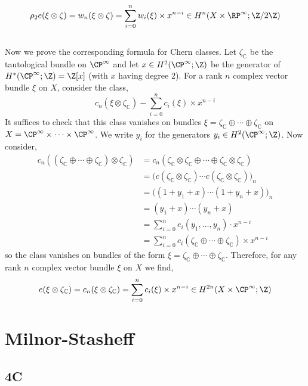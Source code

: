 \documentclass[12pt]{extarticle}
\newcommand{\C}{\mathbb{C}}
\begin{document}
\[ \rho_2 e(\xi \otimes \zeta) = w_n(\xi \otimes \zeta) = \sum_{i = 0}^n w_i(\xi) \times x^{n-i} \in H^n(X \times \RP^\infty; \Z / 2 \Z) \]
\bigskip\\
Now we prove the corresponding formula for Chern classes. Let $\zeta_\C$ be the tautological bundle on $\CP^\infty$ and let $x \in H^2(\CP^\infty;\Z)$ be the generator of $H^*(\CP^\infty ; \Z) = \Z[x]$ (with $x$ having degree $2$). For a rank $n$ complex vector bundle $\xi$ on $X$, consider the class,
\[ c_n(\xi \otimes \zeta_\C) - \sum_{i = 0}^n c_i(\xi) \times x^{n-i} \]
It suffices to check that this class vanishes on bundles $\xi = \zeta_\C \oplus \cdots \oplus \zeta_\C$ on $X = \CP^\infty \times \cdots \times \CP^\infty$. We write $y_i$ for the generators $y_i \in H^2(\CP^\infty; \Z)$. Now consider,
\begin{align*}
c_n((\zeta_\C \oplus \cdots \oplus \zeta_\C) \otimes \zeta_\C) & = c_n(\zeta_\C \otimes \zeta_\C \oplus \cdots \oplus \zeta_\C \otimes \zeta_\C) 
\\
& = \big( c(\zeta_\C \otimes \zeta_\C) \cdots c(\zeta_\C \otimes \zeta_\C) \big)_n
\\
& = \big( (1 + y_1 + x) \cdots (1 + y_n + x) \big)_n
\\
& = (y_1 + x) \cdots (y_n + x) 
\\
& = \sum_{i = 0}^n e_i(y_1, \dots, y_n) \cdot x^{n-i}
\\
& = \sum_{i = 0}^n c_i(\zeta_\C \oplus \cdots \oplus \zeta_\C) \times x^{n-i}
\end{align*}
so the class vanishes on bundles of the form $\xi = \zeta_\C \oplus \cdots \oplus \zeta_\C$.
Therefore, for any rank $n$ complex vector bundle $\xi$ on $X$ we find,
\[ e(\xi \otimes \zeta_\C) = c_n(\xi \otimes \zeta_\C) = \sum_{i = 0}^n c_i(\xi) \times x^{n-i} \in H^{2n}(X \times \CP^\infty; \Z) \]

\section{Milnor-Stasheff}

\subsection{4C}
\end{document}
